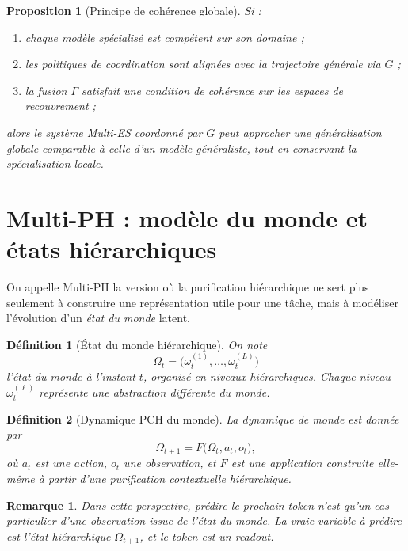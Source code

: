 \documentclass[11pt,a4paper]{article}
\newtheorem{definition}{Définition}[section]
\newtheorem{proposition}{Proposition}[section]
\newtheorem{remark}{Remarque}[section]
\newcommand{\1}{\mathbf 1}
\begin{document}
\begin{proposition}[Principe de cohérence globale]
Si :
\begin{enumerate}[leftmargin=2em]
    \item chaque modèle spécialisé est compétent sur son domaine ;
    \item les politiques de coordination sont alignées avec la trajectoire générale via \(G\) ;
    \item la fusion \(\Gamma\) satisfait une condition de cohérence sur les espaces de recouvrement ;
\end{enumerate}
alors le système Multi-ES coordonné par \(G\) peut approcher une généralisation globale comparable à celle d'un modèle généraliste, tout en conservant la spécialisation locale.
\end{proposition}

\section{Multi-PH : modèle du monde et états hiérarchiques}

On appelle Multi-PH la version où la purification hiérarchique ne sert plus seulement à construire une représentation utile pour une tâche, mais à modéliser l'évolution d'un \emph{état du monde} latent.

\begin{definition}[État du monde hiérarchique]
On note
\[
\Omega_t = \bigl(\omega_t^{(1)},\dots,\omega_t^{(L)}\bigr)
\]
l'état du monde à l'instant \(t\), organisé en niveaux hiérarchiques.
Chaque niveau \(\omega_t^{(\ell)}\) représente une abstraction différente du monde.
\end{definition}

\begin{definition}[Dynamique PCH du monde]
La dynamique de monde est donnée par
\[
\Omega_{t+1}
=
F\!\bigl(\Omega_t, a_t, o_t\bigr),
\]
où \(a_t\) est une action, \(o_t\) une observation, et \(F\) est une application construite elle-même à partir d'une purification contextuelle hiérarchique.
\end{definition}

\begin{remark}
Dans cette perspective, prédire le prochain token n'est qu'un cas particulier d'une observation issue de l'état du monde. La vraie variable à prédire est l'état hiérarchique \(\Omega_{t+1}\), et le token est un readout.
\end{remark}
\end{document}

